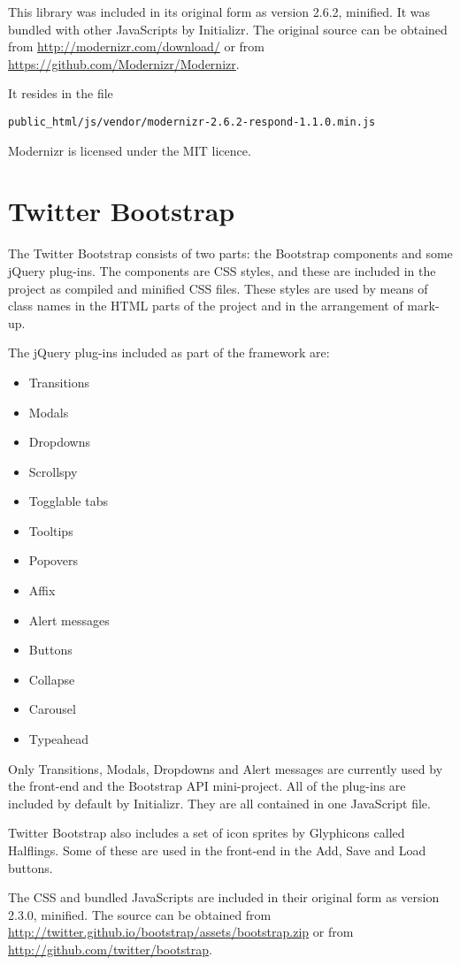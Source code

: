 This library was included in its original form as version 2.6.2, minified. It was bundled with other Java\-Scripts by Initializr. The original source can be obtained from \url{http://modernizr.com/download/} or from \url{https://github.com/Modernizr/Modernizr}.

It resides in the file
\begin{verbatim}public_html/js/vendor/modernizr-2.6.2-respond-1.1.0.min.js\end{verbatim}

Modernizr is licensed under the MIT licence.

\section{Twitter Bootstrap}
The Twitter Bootstrap consists of two parts: the Bootstrap components and some jQuery plug-ins. The components are CSS styles, and these are included in the project as compiled and minified CSS files. These styles are used by means of class names in the HTML parts of the project and in the arrangement of mark-up.

The jQuery plug-ins included as part of the framework are:
\begin{itemize}
	\item Transitions
	\item Modals
	\item Dropdowns
	\item Scrollspy
	\item Togglable tabs
	\item Tooltips
	\item Popovers
	\item Affix
	\item Alert messages
	\item Buttons
	\item Collapse
	\item Carousel
	\item Typeahead
\end{itemize}

Only Transitions, Modals, Dropdowns and Alert messages are currently used by the front-end and the Bootstrap API mini-project. All of the plug-ins are included by default by Initializr. They are all contained in one Java\-Script file.

Twitter Bootstrap also includes a set of icon sprites by Glyphicons called Halflings. Some of these are used in the front-end in the Add, Save and Load buttons.

The CSS and bundled Java\-Scripts are included in their original form as version 2.3.0, minified. The source can be obtained from \url{http://twitter.github.io/bootstrap/assets/bootstrap.zip} or from \url{http://github.com/twitter/bootstrap}.

